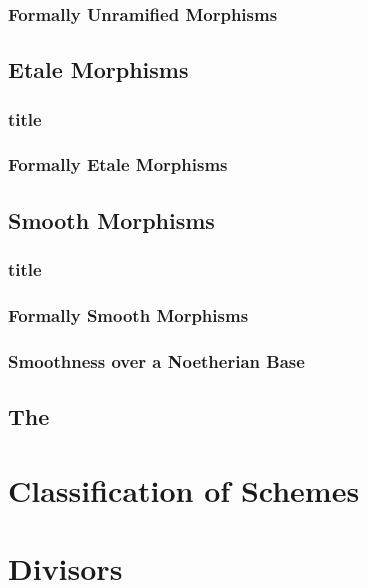 \documentclass[Total.tex]{subfiles}
\begin{document}
			\subsection{Formally Unramified Morphisms}
		\section{Etale Morphisms}
			\subsection{title}
			\subsection{Formally Etale Morphisms}
		\section{Smooth Morphisms}
			\subsection{title}
			\subsection{Formally Smooth Morphisms}
			\subsection{Smoothness over a Noetherian Base}
		\section{The }
	\chapter{Classification of Schemes}
	\chapter{Divisors}
\end{document}

